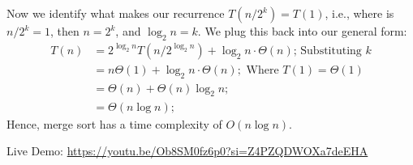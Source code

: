 \begin{Proof}
\vspace{-1.5em}
\noindent
Now we identify what makes our recurrence $T(n/2^k) = T(1)$, i.e., where is $n/2^k = 1$, then $n=2^k$, and $\log_2 n = k$. We plug this back into our general form:
\begin{align*}
    T(n) &= 2^{\log_2 n}T(n/2^{\log_2 n}) + \log_2 n\cdot \Theta(n)\text{; Substituting $k$}\\
    &= n\Theta(1) + \log_2 n\cdot\Theta(n);\text{ Where $T(1)=\Theta(1)$}\\
    &= \Theta(n) + \Theta(n)\log_2 n;\\
    &= \Theta(n\log n);
\end{align*}
Hence, merge sort has a time complexity of $O(n\log n)$.

\end{Proof}

\begin{Tip}
    Live Demo: \url{https://youtu.be/Ob8SM0fz6p0?si=Z4PZQDWOXa7deEHA}
\end{Tip}